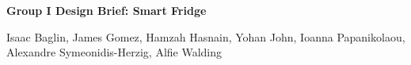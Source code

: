 \begin{center}
    \Huge
    \textbf{Group I Design Brief: Smart Fridge}
    \vspace*{0.33cm}

    \large
    Isaac Baglin, 
    James Gomez, 
    Hamzah Hasnain, 
    Yohan John, 
    Ioanna Papanikolaou, 
    Alexandre Symeonidis-Herzig, 
    Alfie Walding 
\end{center}